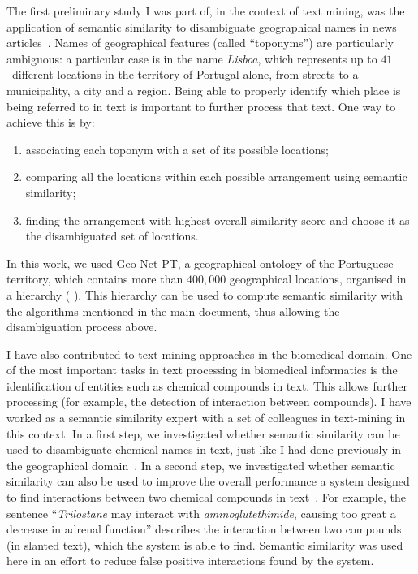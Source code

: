 The first preliminary study I was part of, in the context of text mining, was the application of semantic similarity to disambiguate geographical names in news articles~\citep{Batista2012}. Names of geographical features (called ``toponyms'') are particularly ambiguous: a particular case is in the name \emph{Lisboa}, which represents up to $41$~different locations in the territory of Portugal alone, from streets to a municipality, a city and a region. Being able to properly identify which place is being referred to in text is important to further process that text. One way to achieve this is by:
\begin{enumerate}
    \item associating each toponym with a set of its possible locations;
    \item comparing all the locations within each possible arrangement using semantic similarity;
    \item finding the arrangement with highest overall similarity score and choose it as the disambiguated set of locations.
\end{enumerate}

In this work, we used Geo-Net-PT, a geographical ontology of the Portuguese territory, which contains more than $400{,}000$ geographical locations, organised in a hierarchy (\eg {}  ). This hierarchy can be used to compute semantic similarity with the algorithms mentioned in the main document, thus allowing the disambiguation process above.

I have also contributed to text-mining approaches in the biomedical domain. One of the most important tasks in text processing in biomedical informatics is the identification of entities such as chemical compounds in text. This allows further processing (for example, the detection of interaction between compounds). I have worked as a semantic similarity expert with a set of colleagues in text-mining in this context. In a first step, we investigated whether semantic similarity can be used to disambiguate chemical names in text, just like I had done previously in the geographical domain~\citep{Lamurias2015}. In a second step, we investigated whether semantic similarity can also be used to improve the overall performance a system designed to find interactions between two chemical compounds in text~\citep{Lamurias2014}. For example, the sentence ``\emph{Trilostane} may interact with \emph{aminoglutethimide}, causing too great a decrease in adrenal function'' describes the interaction between two compounds (in slanted text), which the system is able to find. Semantic similarity was used here in an effort to reduce false positive interactions found by the system.


